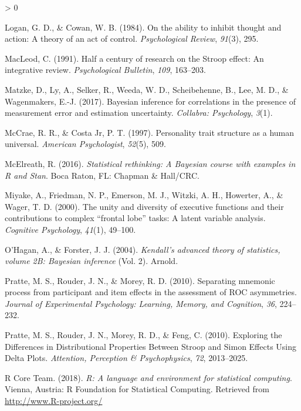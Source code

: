 \documentclass[
  english,
  ,man]{apa6}
\newlength{\cslhangindent}
\newenvironment{CSLReferences}[2] %
 {%
  \setlength{\parindent}{0pt}
  \ifodd #1 \everypar{\setlength{\hangindent}{\cslhangindent}}\ignorespaces\fi
  \ifnum #2 > 0
  \setlength{\parskip}{#2\baselineskip}
  \fi
 }%
 {}
\begin{document}
\begin{CSLReferences}{1}{0}
\leavevmode\hypertarget{ref-Logan.Cowan.1984}{}%
Logan, G. D., \& Cowan, W. B. (1984). On the ability to inhibit thought and action: {A} theory of an act of control. \emph{Psychological Review}, \emph{91}(3), 295.

\leavevmode\hypertarget{ref-MacLeod:1991}{}%
MacLeod, C. (1991). Half a century of research on the {S}troop effect: {A}n integrative review. \emph{Psychological Bulletin}, \emph{109}, 163--203.

\leavevmode\hypertarget{ref-Matzke:etal:2017}{}%
Matzke, D., Ly, A., Selker, R., Weeda, W. D., Scheibehenne, B., Lee, M. D., \& Wagenmakers, E.-J. (2017). Bayesian inference for correlations in the presence of measurement error and estimation uncertainty. \emph{Collabra: Psychology}, \emph{3}(1).

\leavevmode\hypertarget{ref-McCrae:Costa:1997}{}%
McCrae, R. R., \& Costa Jr, P. T. (1997). Personality trait structure as a human universal. \emph{American Psychologist}, \emph{52}(5), 509.

\leavevmode\hypertarget{ref-McElreath:2016}{}%
McElreath, R. (2016). \emph{Statistical rethinking: A {B}ayesian course with examples in {R} and {S}tan}. Boca Raton, FL: Chapman \& Hall/CRC.

\leavevmode\hypertarget{ref-Miyake:etal:2000}{}%
Miyake, A., Friedman, N. P., Emerson, M. J., Witzki, A. H., Howerter, A., \& Wager, T. D. (2000). The unity and diversity of executive functions and their contributions to complex {``frontal lobe''} tasks: A latent variable analysis. \emph{Cognitive Psychology}, \emph{41}(1), 49--100.

\leavevmode\hypertarget{ref-OHagan:Forster:2004}{}%
O'Hagan, A., \& Forster, J. J. (2004). \emph{Kendall's advanced theory of statistics, volume 2B: Bayesian inference} (Vol. 2). Arnold.

\leavevmode\hypertarget{ref-Pratte:etal:2010}{}%
Pratte, M. S., Rouder, J. N., \& Morey, R. D. (2010). Separating mnemonic process from participant and item effects in the assessment of {ROC} asymmetries. \emph{Journal of Experimental Psychology: Learning, Memory, and Cognition}, \emph{36}, 224--232.

\leavevmode\hypertarget{ref-Pratte.etal.2010}{}%
Pratte, M. S., Rouder, J. N., Morey, R. D., \& Feng, C. (2010). Exploring the {Differences} in {Distributional Properties Between Stroop} and {Simon Effects Using Delta Plots}. \emph{Attention, Perception \& Psychophysics}, \emph{72}, 2013--2025.

\leavevmode\hypertarget{ref-RCoreTeam:2018}{}%
R Core Team. (2018). \emph{R: A language and environment for statistical computing}. Vienna, Austria: R Foundation for Statistical Computing. Retrieved from \url{http://www.R-project.org/}


\end{CSLReferences}
\end{document}
